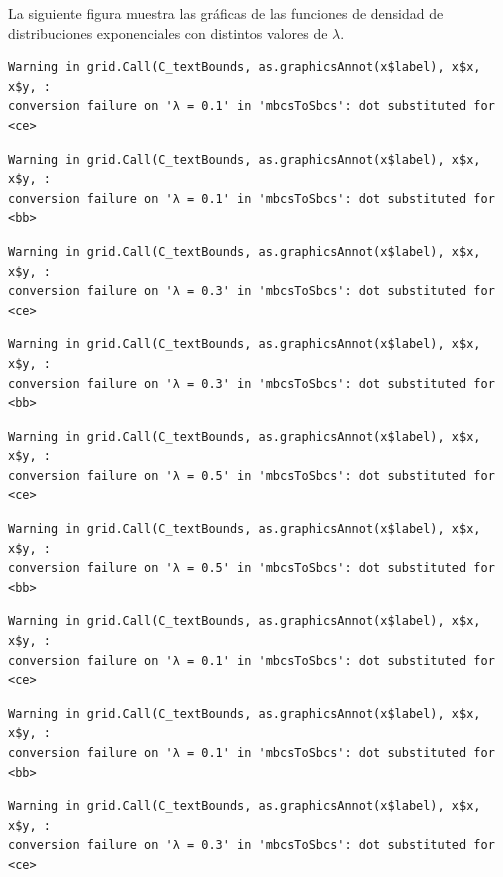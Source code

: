 \documentclass[
  spanish,
  a4paper,
]{scrreport}
\theoremstyle{plain}
\theoremstyle{definition}
\theoremstyle{definition}
\theoremstyle{remark}
\begin{document}
La siguiente figura muestra las gráficas de las funciones de densidad de
distribuciones exponenciales con distintos valores de \(\lambda\).

\begin{verbatim}
Warning in grid.Call(C_textBounds, as.graphicsAnnot(x$label), x$x, x$y, :
conversion failure on 'λ = 0.1' in 'mbcsToSbcs': dot substituted for <ce>
\end{verbatim}

\begin{verbatim}
Warning in grid.Call(C_textBounds, as.graphicsAnnot(x$label), x$x, x$y, :
conversion failure on 'λ = 0.1' in 'mbcsToSbcs': dot substituted for <bb>
\end{verbatim}

\begin{verbatim}
Warning in grid.Call(C_textBounds, as.graphicsAnnot(x$label), x$x, x$y, :
conversion failure on 'λ = 0.3' in 'mbcsToSbcs': dot substituted for <ce>
\end{verbatim}

\begin{verbatim}
Warning in grid.Call(C_textBounds, as.graphicsAnnot(x$label), x$x, x$y, :
conversion failure on 'λ = 0.3' in 'mbcsToSbcs': dot substituted for <bb>
\end{verbatim}

\begin{verbatim}
Warning in grid.Call(C_textBounds, as.graphicsAnnot(x$label), x$x, x$y, :
conversion failure on 'λ = 0.5' in 'mbcsToSbcs': dot substituted for <ce>
\end{verbatim}

\begin{verbatim}
Warning in grid.Call(C_textBounds, as.graphicsAnnot(x$label), x$x, x$y, :
conversion failure on 'λ = 0.5' in 'mbcsToSbcs': dot substituted for <bb>
\end{verbatim}

\begin{verbatim}
Warning in grid.Call(C_textBounds, as.graphicsAnnot(x$label), x$x, x$y, :
conversion failure on 'λ = 0.1' in 'mbcsToSbcs': dot substituted for <ce>
\end{verbatim}

\begin{verbatim}
Warning in grid.Call(C_textBounds, as.graphicsAnnot(x$label), x$x, x$y, :
conversion failure on 'λ = 0.1' in 'mbcsToSbcs': dot substituted for <bb>
\end{verbatim}

\begin{verbatim}
Warning in grid.Call(C_textBounds, as.graphicsAnnot(x$label), x$x, x$y, :
conversion failure on 'λ = 0.3' in 'mbcsToSbcs': dot substituted for <ce>
\end{verbatim}
\end{document}

